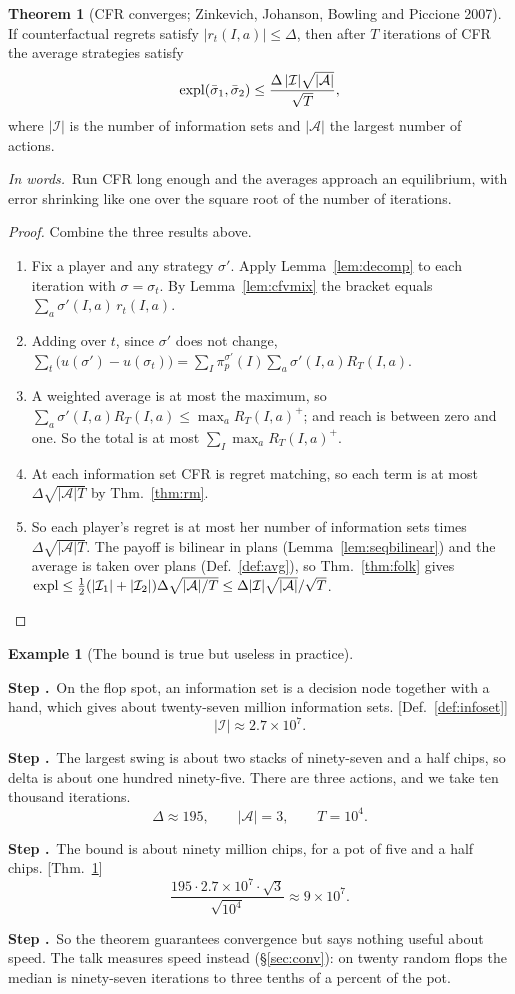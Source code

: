 \documentclass[11pt]{article}
\theoremstyle{definition}
\newtheorem{example}[definition]{Example}
\newtheorem{theorem}[definition]{Theorem}
\newcommand{\inwords}{\par\smallskip\noindent\textit{In words.}\ }
\newcounter{stp}
\newcommand{\steps}{\setcounter{stp}{0}}
\newcommand{\st}{\stepcounter{stp}\par\medskip\noindent\textbf{Step \arabic{stp}.}\ }
\newcommand{\by}[1]{\hfill{\small\color{blue!50!black}[#1]}}
\newcommand{\Def}[1]{Def.~\ref{#1}}\newcommand{\Lem}[1]{Lemma~\ref{#1}}\newcommand{\Thm}[1]{Thm.~\ref{#1}}
\begin{document}
\begin{theorem}[CFR converges; Zinkevich, Johanson, Bowling and Piccione 2007]\label{thm:cfr}
If counterfactual regrets satisfy $|r_t(I,a)|\le\Delta$, then after $T$ iterations of CFR the average strategies satisfy
\[ \mathrm{expl}(\bar\sigma_1,\bar\sigma_2)\le\frac{\Delta\,|\mathcal I|\sqrt{|\mathcal A|}}{\sqrt T}, \]
where $|\mathcal I|$ is the number of information sets and $|\mathcal A|$ the largest number of actions.
\inwords Run CFR long enough and the averages approach an equilibrium, with error shrinking like one over the square
root of the number of iterations.
\end{theorem}
\begin{proof}
Combine the three results above.
\begin{enumerate}[nosep]
\item Fix a player and any strategy $\sigma'$. Apply \Lem{lem:decomp} to each iteration with $\sigma=\sigma_t$. By \Lem{lem:cfvmix}
the bracket equals $\sum_a\sigma'(I,a)\,r_t(I,a)$.
\item Adding over $t$, since $\sigma'$ does not change,
$\sum_t\big(u(\sigma')-u(\sigma_t)\big)=\sum_I\pi_p^{\sigma'}(I)\sum_a\sigma'(I,a)R_T(I,a)$.
\item A weighted average is at most the maximum, so $\sum_a\sigma'(I,a)R_T(I,a)\le\max_aR_T(I,a)^+$; and reach is between zero
and one. So the total is at most $\sum_I\max_aR_T(I,a)^+$.
\item At each information set CFR is regret matching, so each term is at most $\Delta\sqrt{|\mathcal A|T}$ by \Thm{thm:rm}.
\item So each player's regret is at most her number of information sets times $\Delta\sqrt{|\mathcal A|T}$. The payoff is
bilinear in plans (\Lem{lem:seqbilinear}) and the average is taken over plans (\Def{def:avg}), so \Thm{thm:folk} gives
$\mathrm{expl}\le\tfrac12(|\mathcal I_1|+|\mathcal I_2|)\Delta\sqrt{|\mathcal A|/T}\le\Delta|\mathcal I|\sqrt{|\mathcal A|}/\sqrt T$.\qedhere
\end{enumerate}
\end{proof}

\begin{example}[The bound is true but useless in practice]\label{ex:vacuous}
\steps
\st On the flop spot, an information set is a decision node together with a hand, which gives about twenty-seven million
information sets. \by{\Def{def:infoset}}
\[ |\mathcal I|\approx2.7\times10^7. \]
\st The largest swing is about two stacks of ninety-seven and a half chips, so delta is about one hundred ninety-five.
There are three actions, and we take ten thousand iterations.
\[ \Delta\approx195,\qquad|\mathcal A|=3,\qquad T=10^4. \]
\st The bound is about ninety million chips, for a pot of five and a half chips. \by{\Thm{thm:cfr}}
\[ \frac{195\cdot2.7\times10^7\cdot\sqrt3}{\sqrt{10^4}}\approx9\times10^7. \]
\st So the theorem guarantees convergence but says nothing useful about speed. The talk measures speed instead
(\S\ref{sec:conv}): on twenty random flops the median is ninety-seven iterations to three tenths of a percent of the pot.
\end{example}
\end{document}

